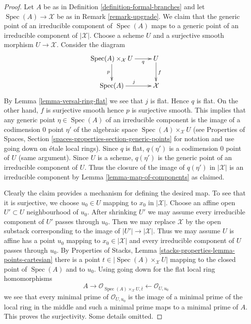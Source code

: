\documentclass{stacks-project}
\theoremstyle{plain}
\theoremstyle{definition}
\theoremstyle{remark}
\numberwithin{equation}{subsection}
\def\Spec{\mathop{\mathrm{Spec}}}
\begin{document}
\begin{proof}
Let $A$ be as in Definition \ref{definition-formal-branches} and
let $\Spec(A) \to \mathcal{X}$ be as in Remark \ref{remark-upgrade}.
We claim that the generic point of an irreducible component of
$\Spec(A)$ maps to a generic point of an irreducible component
of $|\mathcal{X}|$. Choose a scheme $U$ and a surjective
smooth morphism $U \to \mathcal{X}$. Consider the diagram
$$
\xymatrix{
\Spec(A) \times_\mathcal{X} U \ar[d]_p \ar[r]_-q & U \ar[d]^f \\
\Spec(A) \ar[r]^j & \mathcal{X}
}
$$
By Lemma \ref{lemma-versal-ring-flat} we see that $j$ is flat.
Hence $q$ is flat. On the other hand, $f$ is surjective smooth
hence $p$ is surjective smooth. This implies that any generic point
$\eta \in \Spec(A)$ of an irreducible component is the image of a
codimension $0$ point $\eta'$ of the algebraic space
$\Spec(A) \times_\mathcal{X} U$ (see
Properties of Spaces, Section \ref{spaces-properties-section-generic-points}
for notation and use going down on \'etale local rings).
Since $q$ is flat, $q(\eta')$ is a codimension $0$ point of $U$
(same argument).
Since $U$ is a scheme, $q(\eta')$ is the generic point
of an irreducible component of $U$. Thus the closure of the image
of $q(\eta')$ in $|\mathcal{X}|$ is an irreducible component
by Lemma \ref{lemma-map-of-components} as claimed.

\medskip\noindent
Clearly the claim provides a mechanism for defining the desired map.
To see that it is surjective, we choose $u_0 \in U$ mapping to
$x_0$ in $|\mathcal{X}|$. Choose an affine open $U' \subset U$
neighbourhood of $u_0$. After shrinking $U'$ we may assume every
irreducible component of $U'$ passes through $u_0$. Then we may
replace $\mathcal{X}$ by the open substack corresponding to the
image of $|U'| \to |\mathcal{X}|$. Thus we may assume $U$ is affine
has a point $u_0$ mapping to $x_0 \in |\mathcal{X}|$
and every irreducible component of $U$ passes through $u_0$.
By Properties of Stacks, Lemma
\ref{stacks-properties-lemma-points-cartesian}
there is a point $t \in |\Spec(A) \times_\mathcal{X} U|$
mapping to the closed point of $\Spec(A)$ and to $u_0$.
Using going down for the flat local ring homomorphisms
$$
A \longrightarrow
\mathcal{O}_{\Spec(A) \times_\mathcal{X} U, \overline{t}}
\longleftarrow \mathcal{O}_{U, u_0}
$$
we see that every minimal prime of $\mathcal{O}_{U, u_0}$
is the image of a minimal prime of the local ring in the middle
and such a minimal prime maps to a minimal prime of $A$.
This proves the surjectivity. Some details omitted.
\end{proof}
\end{document}

